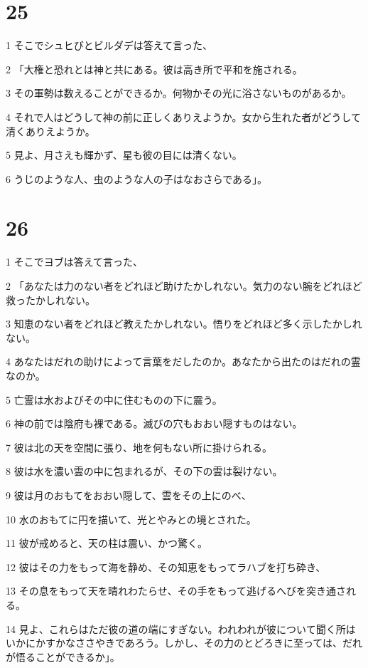 \chapter{25}

\par 1 そこでシュヒびとビルダデは答えて言った、
\par 2 「大権と恐れとは神と共にある。彼は高き所で平和を施される。
\par 3 その軍勢は数えることができるか。何物かその光に浴さないものがあるか。
\par 4 それで人はどうして神の前に正しくありえようか。女から生れた者がどうして清くありえようか。
\par 5 見よ、月さえも輝かず、星も彼の目には清くない。
\par 6 うじのような人、虫のような人の子はなおさらである」。

\chapter{26}

\par 1 そこでヨブは答えて言った、
\par 2 「あなたは力のない者をどれほど助けたかしれない。気力のない腕をどれほど救ったかしれない。
\par 3 知恵のない者をどれほど教えたかしれない。悟りをどれほど多く示したかしれない。
\par 4 あなたはだれの助けによって言葉をだしたのか。あなたから出たのはだれの霊なのか。
\par 5 亡霊は水およびその中に住むものの下に震う。
\par 6 神の前では陰府も裸である。滅びの穴もおおい隠すものはない。
\par 7 彼は北の天を空間に張り、地を何もない所に掛けられる。
\par 8 彼は水を濃い雲の中に包まれるが、その下の雲は裂けない。
\par 9 彼は月のおもてをおおい隠して、雲をその上にのべ、
\par 10 水のおもてに円を描いて、光とやみとの境とされた。
\par 11 彼が戒めると、天の柱は震い、かつ驚く。
\par 12 彼はその力をもって海を静め、その知恵をもってラハブを打ち砕き、
\par 13 その息をもって天を晴れわたらせ、その手をもって逃げるへびを突き通される。
\par 14 見よ、これらはただ彼の道の端にすぎない。われわれが彼について聞く所はいかにかすかなささやきであろう。しかし、その力のとどろきに至っては、だれが悟ることができるか」。

